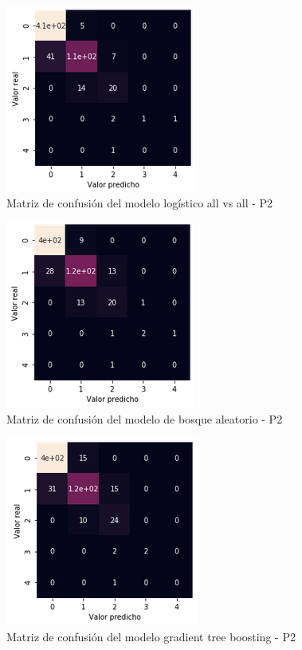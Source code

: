\documentclass[9pt,twocolumn,twoside]{ilcss}
\begin{document}
\begin{appendices}
\begin{figure}[tbhp]
	\centering
	\includegraphics[width=0.6\linewidth]{images/p2_mc_logistic_alltoall.png}
	\caption{Matriz de confusión del modelo logístico all vs all - P2 }
	\label{fig:p2_mc_logistic_alltoall}
\end{figure}

\begin{figure}[tbhp]
	\centering
	\includegraphics[width=0.6\linewidth]{images/p2_mc_rd.png}
	\caption{Matriz de confusión del modelo de bosque aleatorio - P2 }
	\label{fig:p2_mc_rd}
\end{figure}

\begin{figure}[tbhp]
	\centering
	\includegraphics[width=0.6\linewidth]{images/p2_mc_xgboost.png}
	\caption{Matriz de confusión del modelo gradient tree boosting - P2 }
	\label{fig:p2_mc_xgboost}
\end{figure}


\end{appendices}
\end{document}

